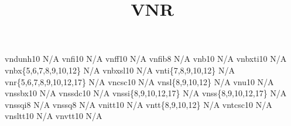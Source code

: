 \documentclass[test]{vnsample}
\title{VNR}
\begin{document}
\begin{shortsample}
   {vndunh10}                  {N/A}
  {vnfi10}                    {N/A}
   {vnff10}                    {N/A}
  {vnfib8}                    {N/A}
    {vnb10}                     {N/A}
  {vnbxti10}                  {N/A}
   {vnbx\{5,6,7,8,9,10,12\}}   {N/A}
  {vnbxsl10}                  {N/A}
   {vnti\{7,8,9,10,12\}}       {N/A}
    {vnr\{5,6,7,8,9,10,12,17\}} {N/A}
   {vncsc10}                   {N/A}
   {vnsl\{8,9,10,12\}}         {N/A}
   {vnu10}                     {N/A}
  {vnssbx10}                  {N/A}
 {vnssdc10}                  {N/A}
  {vnssi\{8,9,10,12,17\}}     {N/A}
   {vnss\{8,9,10,12,17\}}      {N/A}
 {vnssqi8}                   {N/A}
  {vnssq8}                    {N/A}
  {vnitt10}                   {N/A}
   {vntt\{8,9,10,12\}}         {N/A}
  {vntcsc10}                  {N/A}
  {vnsltt10}                  {N/A}
  {vnvtt10}                   {N/A}
\end{shortsample}
\end{document}
